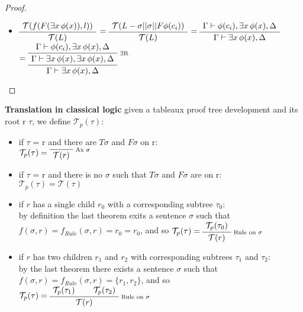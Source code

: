 \documentclass[runningheads]{llncs}
\begin{document}
\begin{proof}
{\begin {itemize}
and $c_i$ does not occour in $\Gamma$ or $\Delta$, as it is a new one.
\item 
$\AxiomC{$\mathcal{T}( f(F(\exists x \, \phi(x)),l))$}\UnaryInfC{$\mathcal{T}(L)$}\DisplayProof$  
$=\AxiomC{$\mathcal{T}( L - \sigma|| \sigma || F \phi(c_i) )$}\UnaryInfC{$\mathcal{T}(L)$}\DisplayProof$  
$=\AxiomC{$\Gamma \vdash \phi(c_i), \exists x \, \phi(x), \Delta$}\UnaryInfC{$\Gamma \vdash \exists x \, \phi(x), \Delta$}\DisplayProof$  
$=\RightLabel{\scriptsize{$\exists$R}}\AxiomC{$\Gamma \vdash \phi(c_i), \exists x \, \phi(x), \Delta$}\UnaryInfC{$\Gamma \vdash \exists x \, \phi(x), \exists x \, \phi(x), \Delta$}\UnaryInfC{$\Gamma \vdash \exists x \, \phi(x), \Delta$}\DisplayProof$

\end  {itemize}
}
    

\end{proof}


\begin{definition} \textbf{Translation in classical logic}
    given a tableaux proof tree development and its root r $\tau$, we define $\mathcal{T}_p(\tau)$:
    \begin{itemize}
        \item if $\tau$ = r and there are $T \sigma $ and $F \sigma $ on r:\\$\mathcal{T}_p(\tau) = \RightLabel{\scriptsize{Ax $\sigma$}}\AxiomC{}\UnaryInfC{$\mathcal{T}(r)$}\DisplayProof$
        \item if $\tau$ = r and there is no $\sigma$ such that $T \sigma $ and $F \sigma $ are on r: \\ $\mathcal{T}_p(\tau) = \mathcal{T}(\tau) $

        \item if $r$ has a single child $r_0$ with a corresponding subtree $\tau_0$: \\by definition the last theorem exits a sentence $\sigma$ such that  
        $f(\sigma,r)=f_{Rule}(\sigma,r)=r_0=r_0$, and so  $\mathcal{T}_p(\tau) = \RightLabel{\scriptsize{Rule on  $\sigma$}}\AxiomC{$\mathcal{T}_p(\tau_0)$}\UnaryInfC{$\mathcal{T}(r)$}\DisplayProof$
        \item if $r$ has two children $r_1$ and $r_2$ with corresponding subtrees $\tau_1$ and $\tau_2$:\\ by the last theorem there exists a sentence $\sigma$  such that
            $f(\sigma, r) = f_{Rule}(\sigma, r) = \{r_1, r_2\}$, and so  
            $\mathcal{T}_p(\tau) = \RightLabel{\scriptsize{Rule on $\sigma$}}\AxiomC{$\mathcal{T}_p(\tau_1)$}\AxiomC{$\mathcal{T}_p(\tau_2)$}\BinaryInfC{$\mathcal{T}(r)$}\DisplayProof$
    \end{itemize}
\end{definition}
\end{document}
